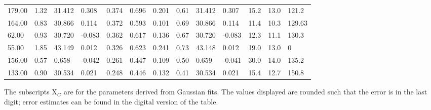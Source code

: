 \begin{table}[htp]
{\begin{tabular}{lllllllllllll}
179.00 & 1.32 & 31.412 & 0.308 & 0.374 & 0.696 & 0.201 & 0.61 & 31.412 & 0.307 & 15.2 & 13.0 & 121.2 \\
164.00 & 0.83 & 30.866 & 0.114 & 0.372 & 0.593 & 0.101 & 0.69 & 30.866 & 0.114 & 11.4 & 10.3 & 129.63 \\
62.00 & 0.93 & 30.720 & -0.083 & 0.362 & 0.617 & 0.136 & 0.67 & 30.720 & -0.083 & 12.3 & 11.1 & 130.3 \\
55.00 & 1.85 & 43.149 & 0.012 & 0.326 & 0.623 & 0.241 & 0.73 & 43.148 & 0.012 & 19.0 & 13.0 & 0 \\
156.00 & 0.57 & 0.658 & -0.042 & 0.261 & 0.447 & 0.109 & 0.50 & 0.659 & -0.041 & 30.0 & 14.0 & 135.2 \\
133.00 & 0.90 & 30.534 & 0.021 & 0.248 & 0.446 & 0.132 & 0.41 & 30.534 & 0.021 & 15.4 & 12.7 & 150.8 \\
\hline
\end{tabular}
}\par
The subscripts X${_G}$ are for the parameters derived from Gaussian fits.  The
values displayed are rounded such that the error is in the last digit; error
estimates can be found in the digital version of the table. 
\end{table}
